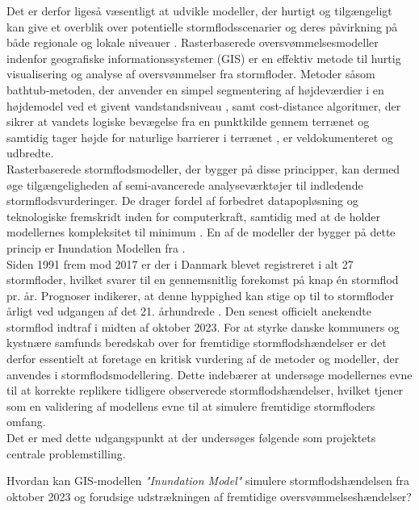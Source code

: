 Det er derfor ligeså væsentligt at udvikle modeller, der hurtigt og tilgængeligt kan give et overblik over potentielle stormflodsscenarier og deres påvirkning på både regionale og lokale niveauer \citep{balstrom_kirby_inundation}. Rasterbaserede oversvømmelsesmodeller indenfor geografiske informationssystemer (GIS) er en effektiv metode til hurtig visualisering og analyse af oversvømmelser fra stormfloder. Metoder såsom bathtub-metoden, der anvender en simpel segmentering af højdeværdier i en højdemodel ved et givent vandstandsniveau \citep{poulter_raster_2008}, samt cost-distance algoritmer, der sikrer at vandets logiske bevægelse fra en punktkilde gennem terrænet og samtidig tager højde for naturlige barrierer i terrænet \citep{li_delineating_2014}, er veldokumenteret og udbredte.\\
Rasterbaserede stormflodsmodeller, der bygger på disse principper, kan dermed øge tilgængeligheden af semi-avancerede analyseværktøjer til indledende stormflodsvurderinger. De drager fordel af forbedret datapopløsning og teknologiske fremskridt inden for computerkraft, samtidig med at de holder modellernes kompleksitet til minimum \citep{balstrom_kirby_inundation, li_delineating_2014}. En af de modeller der bygger på dette princip er Inundation Modellen fra \cite{balstrom_kirby_inundation}.\\

Siden 1991 frem mod 2017 er der i Danmark blevet registreret i alt 27 stormfloder, hvilket svarer til en gennemsnitlig forekomst på knap én stormflod pr. år. Prognoser indikerer, at denne hyppighed kan stige op til to stormfloder årligt ved udgangen af det 21. århundrede \citep{erhvervsministeriet_fremtidige_nodate}. Den senest officielt anekendte stormflod indtraf i midten af oktober 2023. For at styrke danske kommuners og kystnære samfunds beredskab over for fremtidige stormflodshændelser er det derfor essentielt at foretage en kritisk vurdering af de metoder og modeller, der anvendes i stormflodsmodellering. Dette indebærer at undersøge modellernes evne til at korrekte replikere tidligere observerede stormflodshændelser, hvilket tjener som en validering af modellens evne til at simulere fremtidige stormfloders omfang.\\

Det er med dette udgangspunkt at der undersøges følgende som projektets centrale problemstilling. 
\begin{center}
    {\centering Hvordan kan GIS-modellen \textit{"Inundation Model"} simulere stormflodshændelsen fra oktober 2023 og forudsige udstrækningen af fremtidige oversvømmelseshændelser?}
\end{center}

